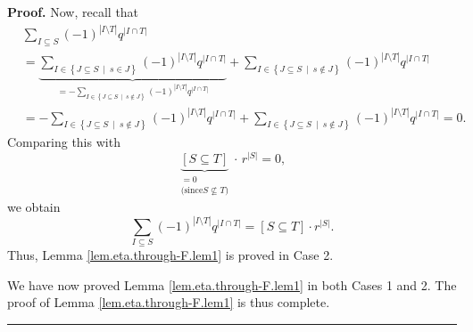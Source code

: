 \documentclass[numbers=enddot,12pt,final,onecolumn,notitlepage]{scrartcl}%
\theoremstyle{definition}
\newenvironment{proof}[1][Proof]{\noindent\textbf{#1.} }{\ \rule{0.5em}{0.5em}}
\let\sumnonlimits\sum
\renewcommand{\sum}{\sumnonlimits\limits}
\newenvironment{verlong}{}{}
\begin{document}
\begin{verlong}
\begin{proof}
Now, recall that%
\begin{align*}
&  \sum_{I\subseteq S}\left(  -1\right)  ^{\left\vert I\setminus T\right\vert
}q^{\left\vert I\cap T\right\vert }\\
&  =\underbrace{\sum_{I\in\left\{  J\subseteq S\ \mid\ s\in J\right\}
}\left(  -1\right)  ^{\left\vert I\setminus T\right\vert }q^{\left\vert I\cap
T\right\vert }}_{=-\sum_{I\in\left\{  J\subseteq S\ \mid\ s\notin J\right\}
}\left(  -1\right)  ^{\left\vert I\setminus T\right\vert }q^{\left\vert I\cap
T\right\vert }}+\sum_{I\in\left\{  J\subseteq S\ \mid\ s\notin J\right\}
}\left(  -1\right)  ^{\left\vert I\setminus T\right\vert }q^{\left\vert I\cap
T\right\vert }\\
&  =-\sum_{I\in\left\{  J\subseteq S\ \mid\ s\notin J\right\}  }\left(
-1\right)  ^{\left\vert I\setminus T\right\vert }q^{\left\vert I\cap
T\right\vert }+\sum_{I\in\left\{  J\subseteq S\ \mid\ s\notin J\right\}
}\left(  -1\right)  ^{\left\vert I\setminus T\right\vert }q^{\left\vert I\cap
T\right\vert }=0.
\end{align*}
Comparing this with%
\[
\underbrace{\left[  S\subseteq T\right]  }_{\substack{=0\\\text{(since
}S\not \subseteq T\text{)}}}\cdot\,r^{\left\vert S\right\vert }=0,
\]
we obtain%
\[
\sum_{I\subseteq S}\left(  -1\right)  ^{\left\vert I\setminus T\right\vert
}q^{\left\vert I\cap T\right\vert }=\left[  S\subseteq T\right]  \cdot
r^{\left\vert S\right\vert }.
\]
Thus, Lemma \ref{lem.eta.through-F.lem1} is proved in Case 2.

We have now proved Lemma \ref{lem.eta.through-F.lem1} in both Cases 1 and 2.
The proof of Lemma \ref{lem.eta.through-F.lem1} is thus complete.
\end{proof}
\end{verlong}
\end{document}
